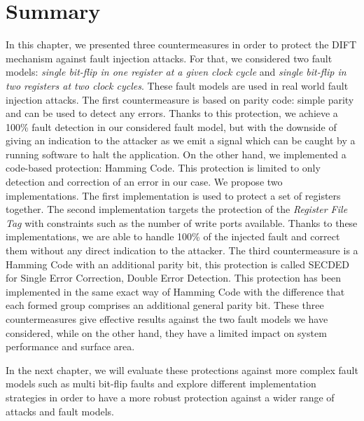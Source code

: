 \section{Summary}
In this chapter, we presented three countermeasures in order to protect the DIFT mechanism against fault injection attacks. For that, we considered two fault models: \textit{single bit-flip in one register at a given clock cycle} and \textit{single bit-flip in two registers at two clock cycles}. These fault models are used in real world fault injection attacks.
The first countermeasure is based on parity code: simple parity and can be used to detect any errors. Thanks to this protection, we achieve a 100\% fault detection in our considered fault model, but with the downside of giving an indication to the attacker as we emit a signal which can be caught by a running software to halt the application.
On the other hand, we implemented a code-based protection: Hamming Code. This protection is limited to only detection and correction of an error in our case. We propose two implementations. The first implementation is used to protect a set of registers together. The second implementation targets the protection of the \textit{Register File Tag} with constraints such as the number of write ports available. Thanks to these implementations, we are able to handle 100\% of the injected fault and correct them without any direct indication to the attacker.
The third countermeasure is a Hamming Code with an additional parity bit, this protection is called SECDED for Single Error Correction, Double Error Detection. This protection has been implemented in the same exact way of Hamming Code with the difference that each formed group comprises an additional general parity bit.
These three countermeasures give effective results against the two fault models we have considered, while on the other hand, they have a limited impact on system performance and surface area.

In the next chapter, we will evaluate these protections against more complex fault models such as multi bit-flip faults and explore different implementation strategies in order to have a more robust protection against a wider range of attacks and fault models.

